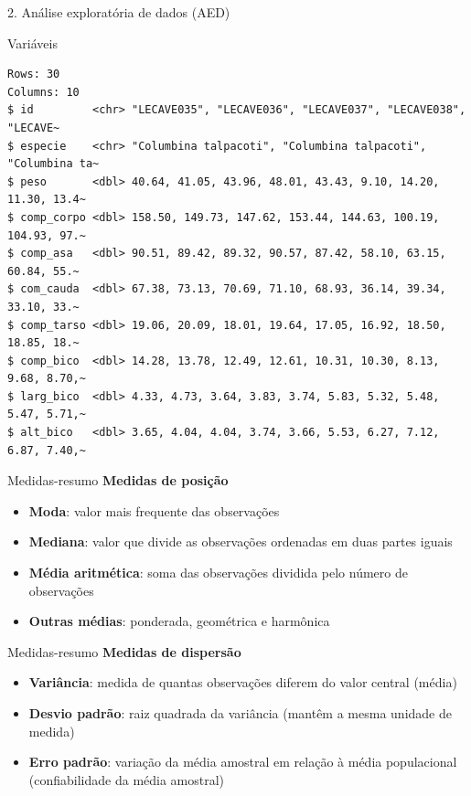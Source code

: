 \documentclass[
  ignorenonframetext,
]{beamer}
\begin{document}
\begin{frame}[fragile]{2. Análise exploratória de dados (AED)}
\begin{block}{Variáveis}
\begin{verbatim}
Rows: 30
Columns: 10
$ id         <chr> "LECAVE035", "LECAVE036", "LECAVE037", "LECAVE038", "LECAVE~
$ especie    <chr> "Columbina talpacoti", "Columbina talpacoti", "Columbina ta~
$ peso       <dbl> 40.64, 41.05, 43.96, 48.01, 43.43, 9.10, 14.20, 11.30, 13.4~
$ comp_corpo <dbl> 158.50, 149.73, 147.62, 153.44, 144.63, 100.19, 104.93, 97.~
$ comp_asa   <dbl> 90.51, 89.42, 89.32, 90.57, 87.42, 58.10, 63.15, 60.84, 55.~
$ com_cauda  <dbl> 67.38, 73.13, 70.69, 71.10, 68.93, 36.14, 39.34, 33.10, 33.~
$ comp_tarso <dbl> 19.06, 20.09, 18.01, 19.64, 17.05, 16.92, 18.50, 18.85, 18.~
$ comp_bico  <dbl> 14.28, 13.78, 12.49, 12.61, 10.31, 10.30, 8.13, 9.68, 8.70,~
$ larg_bico  <dbl> 4.33, 4.73, 3.64, 3.83, 3.74, 5.83, 5.32, 5.48, 5.47, 5.71,~
$ alt_bico   <dbl> 3.65, 4.04, 4.04, 3.74, 3.66, 5.53, 6.27, 7.12, 6.87, 7.40,~
\end{verbatim}
\end{block}

\begin{block}{Medidas-resumo}
\protect\hypertarget{medidas-resumo}{}
\textbf{Medidas de posição}

\begin{itemize}
\item
  \textbf{Moda}: valor mais frequente das observações
\item
  \textbf{Mediana}: valor que divide as observações ordenadas em duas
  partes iguais
\item
  \textbf{Média aritmética}: soma das observações dividida pelo número
  de observações
\item
  \textbf{Outras médias}: ponderada, geométrica e harmônica
\end{itemize}
\end{block}

\begin{block}{Medidas-resumo}
\protect\hypertarget{medidas-resumo-1}{}
\textbf{Medidas de dispersão}

\begin{itemize}
\item
  \textbf{Variância}: medida de quantas observações diferem do valor
  central (média)
\item
  \textbf{Desvio padrão}: raiz quadrada da variância (mantêm a mesma
  unidade de medida)
\item
  \textbf{Erro padrão}: variação da média amostral em relação à média
  populacional (confiabilidade da média amostral)
\end{itemize}
\end{block}


\end{frame}
\end{document}
